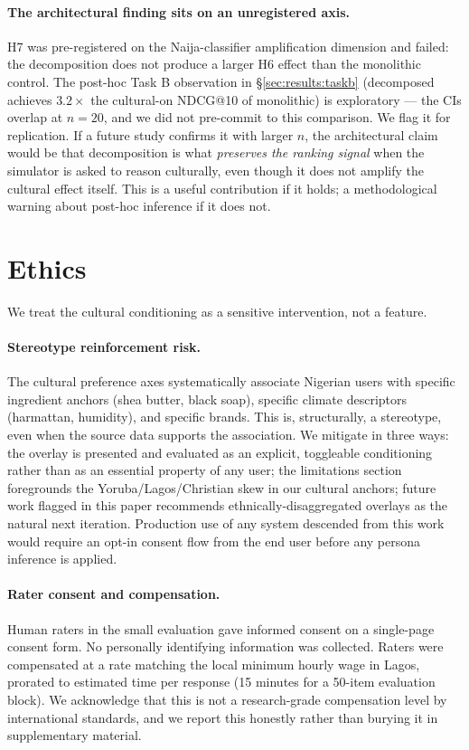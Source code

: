 \documentclass[8pt,twocolumn,a4paper]{extarticle}
\begin{document}
\paragraph{The architectural finding sits on an unregistered axis.}
H7 was pre-registered on the Naija-classifier amplification dimension and failed: the decomposition does not produce a larger H6 effect than the monolithic control. The post-hoc Task B observation in \S\ref{sec:results:taskb} (decomposed achieves $3.2\times$ the cultural-on NDCG@10 of monolithic) is exploratory --- the CIs overlap at $n=20$, and we did not pre-commit to this comparison. We flag it for replication. If a future study confirms it with larger $n$, the architectural claim would be that decomposition is what \emph{preserves the ranking signal} when the simulator is asked to reason culturally, even though it does not amplify the cultural effect itself. This is a useful contribution if it holds; a methodological warning about post-hoc inference if it does not.

\section{Ethics}
\label{sec:ethics}

We treat the cultural conditioning as a sensitive intervention, not a feature.

\paragraph{Stereotype reinforcement risk.}
The cultural preference axes systematically associate Nigerian users with specific ingredient anchors (shea butter, black soap), specific climate descriptors (harmattan, humidity), and specific brands. This is, structurally, a stereotype, even when the source data supports the association. We mitigate in three ways: the overlay is presented and evaluated as an explicit, toggleable conditioning rather than as an essential property of any user; the limitations section foregrounds the Yoruba/Lagos/Christian skew in our cultural anchors; future work flagged in this paper recommends ethnically-disaggregated overlays as the natural next iteration. Production use of any system descended from this work would require an opt-in consent flow from the end user before any persona inference is applied.

\paragraph{Rater consent and compensation.}
Human raters in the small evaluation gave informed consent on a single-page consent form. No personally identifying information was collected. Raters were compensated at a rate matching the local minimum hourly wage in Lagos, prorated to estimated time per response (15 minutes for a 50-item evaluation block). We acknowledge that this is not a research-grade compensation level by international standards, and we report this honestly rather than burying it in supplementary material.
\end{document}
